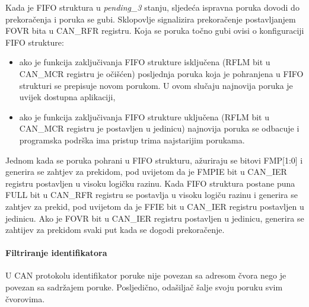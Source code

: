 Kada je FIFO struktura u \textit{pending\_3} stanju, sljedeća ispravna poruka dovodi do prekoračenja i poruka se gubi. Sklopovlje signalizira prekoračenje postavljanjem FOVR bita u CAN\_RFR registru. Koja se poruka točno gubi ovisi o konfiguraciji FIFO strukture:
\begin{itemize}
	\item ako je funkcija zaključivanja FIFO strukture isključena (RFLM bit u CAN\_MCR registru je očišćen) posljednja poruka koja je pohranjena u FIFO strukturi se prepisuje novom porukom. U ovom slučaju najnovija poruka je uvijek dostupna aplikaciji,
	\item ako je funkcija zaključivanja FIFO strukture uključena (RFLM bit u CAN\_MCR registru je postavljen u jedinicu) najnovija poruka se odbacuje i programska podrška ima pristup trima najstarijim porukama.
\end{itemize}

Jednom kada se poruka pohrani u FIFO strukturu, ažuriraju se bitovi FMP[1:0] i generira se zahtjev za prekidom, pod uvijetom da je FMPIE bit u CAN\_IER registru postavljen u visoku logičku razinu. Kada FIFO struktura postane puna FULL bit u CAN\_RFR registru se postavlja u visoku logiču razinu i generira se zahtjev za prekid, pod uvijetom da je FFIE bit u CAN\_IER registru postavljen u jedinicu. Ako je FOVR bit u CAN\_IER registru postavljen u jedinicu, generira se zahtijev za prekidom svaki put kada se dogodi prekoračenje.

\paragraph{Filtriranje identifikatora}

U CAN protokolu identifikator poruke nije povezan sa adresom čvora nego je povezan sa sadržajem poruke. Posljedično, odašiljač šalje svoju poruku svim čvorovima.

